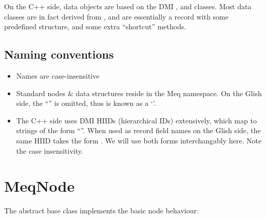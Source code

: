 \documentclass[10pt]{article}
\begin{document}
  On the C++ side, data objects are based on the DMI ,  and
   classes. Most data classes are in fact derived from , and
  are essentially a record with some predefined structure, and some extra
  ``shortcut'' methods. 

\subsection{Naming conventions}

  \begin{itemize}

  \item Names are case-insensitive
  
  \item Standard nodes \& data structures reside in the Meq namespace. On the 
    Glish side, the ``\qq{::}'' is omitted, thus  is known as a
    `'.
    
  \item The C++ side uses DMI HIIDs (hierarchical IDs) extensively, which map
    to strings of the form ``''. When used as record field
    names on the Glish side, the same HIID takes the form . We
    will use both forms interchangably here. Note the case insensitivity.

  \end{itemize}
    
\section{MeqNode}

  The abstract base class  implements the basic node behaviour:
\end{document}
